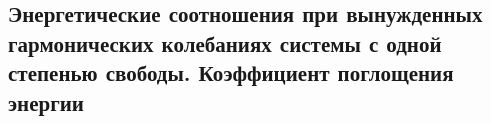 

\subsection{Энергетические соотношения при вынужденных гармонических колебаниях системы с одной степенью свободы. Коэффициент поглощения энергии}



